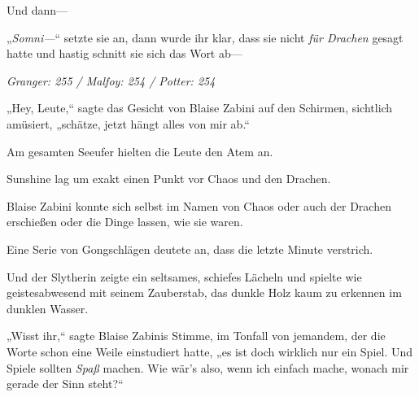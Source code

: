 Und dann—

„\emph{Somni—}“ setzte sie an, dann wurde ihr klar, dass sie nicht \emph{für Drachen} gesagt hatte und hastig schnitt sie sich das Wort ab—

\later

\emph{Granger: 255 / Malfoy: 254 / Potter: 254}

„Hey, Leute,“ sagte das Gesicht von Blaise Zabini auf den Schirmen, sichtlich amüsiert, „schätze, jetzt hängt alles von mir ab.“

Am gesamten Seeufer hielten die Leute den Atem an.

Sunshine lag um exakt einen Punkt vor Chaos und den Drachen.

Blaise Zabini konnte sich selbst im Namen von Chaos oder auch der Drachen erschießen oder die Dinge lassen, wie sie waren.

Eine Serie von Gongschlägen deutete an, dass die letzte Minute verstrich.

Und der Slytherin zeigte ein seltsames, schiefes Lächeln und spielte wie geistesabwesend mit seinem Zauberstab, das dunkle Holz kaum zu erkennen im dunklen Wasser.

„Wisst ihr,“ sagte Blaise Zabinis Stimme, im Tonfall von jemandem, der die Worte schon eine Weile einstudiert hatte, „es ist doch wirklich nur ein Spiel. Und Spiele sollten \emph{Spaß} machen. Wie wär’s also, wenn ich einfach mache, wonach mir gerade der Sinn steht?“

